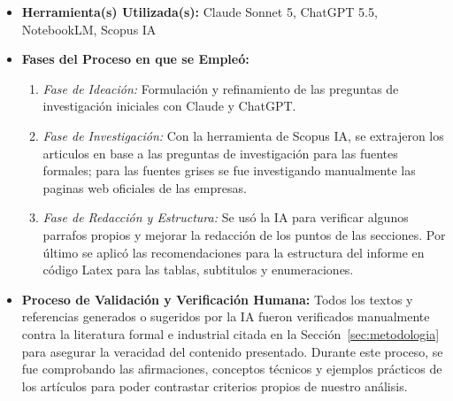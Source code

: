 \documentclass[12pt,letterpaper]{article}
\begin{document}
\begin{itemize}
    \item \textbf{Herramienta(s) Utilizada(s):} Claude Sonnet 5, ChatGPT 5.5, NotebookLM, Scopus IA
    \item \textbf{Fases del Proceso en que se Empleó:} 
    \begin{enumerate}
        \item \textit{Fase de Ideación:} Formulación y refinamiento de las preguntas de investigación iniciales con Claude y ChatGPT.
        \item \textit{Fase de Investigación:} Con la herramienta de Scopus IA, se extrajeron los articulos en base a las preguntas de investigación para las fuentes formales; para las fuentes grises se fue investigando manualmente las paginas web oficiales de las empresas.
        \item \textit{Fase de Redacción y Estructura:} Se usó la IA para verificar algunos parrafos propios y mejorar la redacción de los puntos de las secciones. Por último se aplicó las recomendaciones para la estructura del informe en código Latex para las tablas, subtitulos y enumeraciones. %
    \end{enumerate}
    \item \textbf{Proceso de Validación y Verificación Humana:} %
    Todos los textos y referencias generados o sugeridos por la IA fueron verificados manualmente contra la literatura formal e industrial citada en la Sección~\ref{sec:metodologia} para asegurar la veracidad del contenido presentado. Durante este proceso, se fue comprobando las afirmaciones, conceptos técnicos y ejemplos prácticos de los artículos para poder contrastar criterios propios de nuestro análisis.
\end{itemize}
\end{document}
